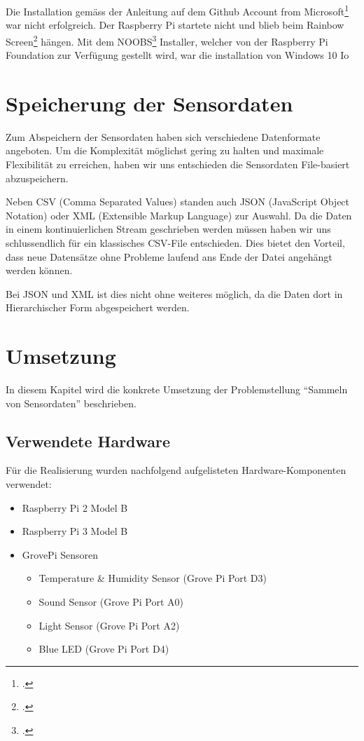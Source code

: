 Die Installation gemäss der Anleitung auf dem Github Account from Microsoft\footcite{install_win10iot_2016-04-25} war nicht erfolgreich. 
Der Raspberry Pi startete nicht und blieb beim Rainbow Screen\footcite{RPi_Rainbowscreen_2016-04-25} hängen. 
Mit dem NOOBS\footcite{NOOBS_2016-04-25} Installer, welcher von der Raspberry Pi Foundation zur Verfügung gestellt wird, war die installation von Windows 10 Io


\section{Speicherung der Sensordaten}
Zum Abspeichern der Sensordaten haben sich verschiedene Datenformate angeboten. Um die Komplexität möglichst gering zu halten und maximale Flexibilität zu erreichen, haben wir uns entschieden die Sensordaten File-basiert abzuspeichern.

Neben CSV (Comma Separated Values) standen auch JSON (JavaScript Object Notation) oder XML (Extensible Markup Language) zur Auswahl. Da die Daten in einem kontinuierlichen Stream geschrieben werden müssen haben wir uns schlussendlich für ein klassisches CSV-File entschieden. Dies bietet den Vorteil, dass neue Datensätze ohne Probleme laufend ans Ende der Datei angehängt werden können.

Bei JSON und XML ist dies nicht ohne weiteres möglich, da die Daten dort in Hierarchischer Form abgespeichert werden.


\section{Umsetzung}
In diesem Kapitel wird die konkrete Umsetzung der Problemstellung "`Sammeln von Sensordaten"' beschrieben.

\subsection{Verwendete Hardware}
Für die Realisierung wurden nachfolgend aufgelisteten Hardware-Komponenten verwendet:
\begin{itemize}
\item Raspberry Pi 2 Model B
\item Raspberry Pi 3 Model B
\item GrovePi Sensoren
\begin{itemize}
\item Temperature \& Humidity Sensor (Grove Pi Port D3)
\item Sound Sensor (Grove Pi Port A0)
\item Light Sensor (Grove Pi Port A2)
\item Blue LED (Grove Pi Port D4)
\end{itemize}
\end{itemize}


